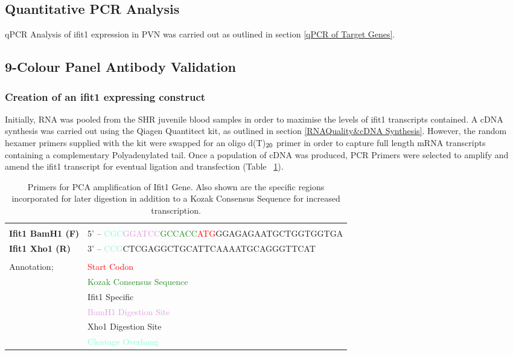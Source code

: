 \subsection{Quantitative PCR Analysis}
qPCR Analysis of \acrshort{ifit1} expression in PVN was carried out as outlined in section \ref{qPCR of Target Genes}.

\subsection{9-Colour Panel Antibody Validation}

\subsubsection{Creation of an \acrshort{ifit1} expressing construct}

Initially, RNA was pooled from the SHR juvenile blood samples in order to maximise the levels of \acrshort{ifit1} transcripts contained. A cDNA synthesis was carried out using the Qiagen Quantitect kit, as outlined in section \ref{RNAQuality&cDNA Synthesis}. However, the random hexamer primers supplied with the kit were swapped for an oligo d(T)$\textsubscript{20}$ primer in order to capture full length mRNA transcripts containing a complementary Polyadenylated tail. Once a population of cDNA was produced, PCR Primers were selected to amplify and amend the \acrshort{ifit1} transcript for eventual ligation and transfection (Table ~\ref{tab:PCRPRimers}).

\begin{table}[!htbp]
\centering
\scriptsize
\begin{tabular}{ll}
                          & \\
\textbf{Ifit1 BamH1 (F)}  & 5’ – \textcolor{Aquamarine}{CGC}\textcolor{Plum}{GGATCC}\textcolor{ForestGreen}{GCCACC}\textcolor{Red}{ATG}GGAGAGAATGCTGGTGGTGA\\
\textbf{Ifit1 Xho1 (R)}   & 3’ – \textcolor{Aquamarine}{CCG}\textcolor{BurntOrange}{CTCGAG}GCTGCATTCAAAATGCAGGGTTCAT\\
                          & \\
Annotation;               & \textcolor{Red}{Start Codon}\\
                          & \textcolor{ForestGreen}{Kozak Consensus Sequence}\\
                          & Ifit1 Specific\\
                          & \textcolor{Plum}{BamH1 Digestion Site}\\
                          & \textcolor{BurntOrange}{Xho1 Digestion Site}\\
                          & \textcolor{Aquamarine}{Cleavage Overhang}\\
\end{tabular}
\caption[Primers for PCA amplification of Ifit1 Gene]{Primers for PCA amplification of Ifit1 Gene. Also shown are the specific regions incorporated for later digestion in addition to a Kozak Consensus Sequence for increased transcription.}
\label{tab:PCRPRimers}
\end{table}


